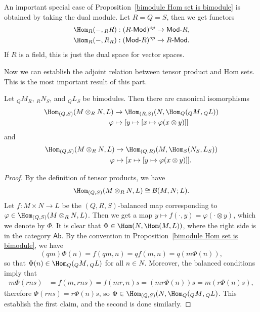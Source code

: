 \begin{example}
An important special case of Proposition~\ref{bimodule Hom set is bimodule} is obtained by taking the dual module. Let $R=Q=S$, then we get functors
\begin{align*}
&\Hom_R(-,{_{R}R}):(R\text{-}\mathsf{Mod})^{op}\to\mathsf{Mod}\text{-}R,\\
&\Hom_R(-,{R_{R}}):(\mathsf{Mod}\text{-}R)^{op}\to R\text{-}\mathsf{Mod}.
\end{align*}
If $R$ is a field, this is just the dual space for vector spaces.
\end{example}
Now we can establish the adjoint relation between tensor product and Hom sets. This is the most important result of this part.
\begin{proposition}\label{adjoint tnesor and hom}
Let $_{Q}M_{R}$, $_{R}N_{S}$, and $_{Q}L_{S}$ be bimodules. Then there are canonical isomorphisms
\begin{align*}
\Hom_{(Q,S)}(M\otimes_RN,L)&\to\Hom_{(R,S)}(N,\Hom_Q({_{Q}M},{_{Q}L}))\\
\varphi&\mapsto[y\mapsto[x\mapsto\varphi(x\otimes y)]]
\end{align*}
and
\begin{align*}
\Hom_{(Q,S)}(M\otimes_RN,L)&\to\Hom_{(Q,R)}(M,\Hom_S({N_{S}},{L_{S}}))\\
\varphi&\mapsto[x\mapsto[y\mapsto\varphi(x\otimes y)]].
\end{align*}
\end{proposition}
\begin{proof}
By the definition of tensor products, we have
\begin{align*}
\Hom_{(Q,S)}(M\otimes_RN,L)\cong\mathcal{B}(M,N;L).
\end{align*}
Let $f:M\times N\to L$ be the $(Q,R,S)$-balanced map corresponding to $\varphi\in\Hom_{(Q,S)}(M\otimes_RN,L)$. Then we get a map $y\mapsto f(\cdot,y)=\varphi(\cdot\otimes y)$, which we denote by $\Phi$. It is clear that $\Phi\in\Hom(N,\Hom(M,L))$, where the right side is in the category $\mathsf{Ab}$. By the convention in Proposition~\ref{bimodule Hom set is bimodule}, we have
\[(qm)\Phi(n)=f(qm,n)=qf(m,n)=q(m\Phi(n)),\]
so that $\Phi(n)\in\Hom_Q({_{Q}M},{_{Q}L})$ for all $n\in N$. Moreover, the balanced conditions imply that
\begin{align*}
m\Phi(rns)&=f(m,rns)=f(mr,n)s=(mr\Phi(n))s=m(r\Phi(n)s),
\end{align*}
therefore $\Phi(rns)=r\Phi(n)s$, so $\Phi\in\Hom_{(Q,S)}(N,\Hom_Q({_{Q}M},{_{Q}L})$. This establish the first claim, and the second is done similarly.
\end{proof}
